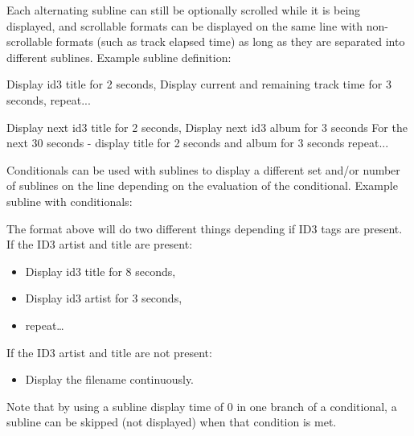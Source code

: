 Each alternating subline can still be optionally scrolled while it is
being displayed, and scrollable formats can be displayed on the same
line with non{}-scrollable formats (such as track elapsed time) as long
as they are separated into different sublines.
Example subline definition:
\begin{example}
                                 Display id3 title for 2 seconds,
                                 Display current and remaining track time
                                 for 3 seconds,
                                 repeat...

                                 Display next id3 title for 2 seconds,
                                 Display next id3 album for 3 seconds
                                 For the next 30 seconds - display title for 2 seconds and album for 3 seconds
                                 repeat...
\end{example}

Conditionals can be used with sublines to display a different set and/or number
of sublines on the line depending on the evaluation of the conditional.
Example subline with conditionals:
\begin{example}
\end{example}

The format above will do two different things depending if ID3 tags are
present. If the ID3 artist and title are present:
\begin{itemize}
\item Display id3 title for 8 seconds,
\item Display id3 artist for 3 seconds,
\item repeat\dots
\end{itemize}
If the ID3 artist and title are not present:
\begin{itemize}
\item Display the filename continuously.
\end{itemize}
Note that by using a subline display time of 0 in one branch of a conditional,
a subline can be skipped (not displayed) when that condition is met.

